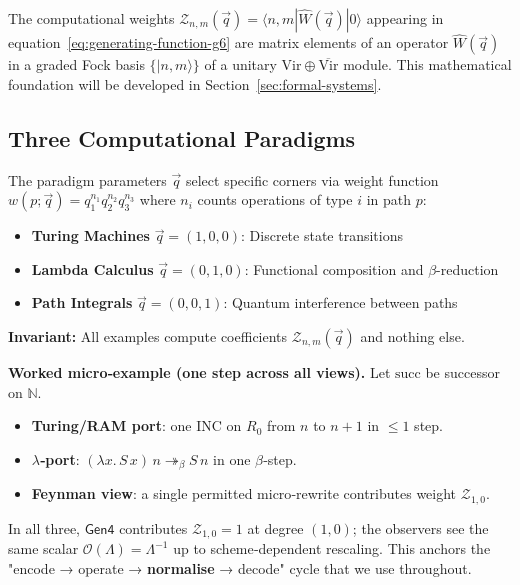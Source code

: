 The computational weights $\mathcal{Z}_{n,m}(\vec{q})=\langle n,m|\hat{W}(\vec{q})|0\rangle$ appearing in equation~\eqref{eq:generating-function-g6} are matrix elements of an operator $\hat{W}(\vec{q})$ in a graded Fock basis $\{|n,m\rangle\}$ of a unitary $\text{Vir}\oplus\overline{\text{Vir}}$ module. This mathematical foundation will be developed in Section~\ref{sec:formal-systems}.

\subsection{Three Computational Paradigms}

The paradigm parameters $\vec{q}$ select specific corners via weight function $w(p;\vec{q}) = q_1^{n_1} q_2^{n_2} q_3^{n_3}$ where $n_i$ counts operations of type $i$ in path $p$:
\begin{itemize}
\item \textbf{Turing Machines} $\vec{q} = (1,0,0)$: Discrete state transitions
\item \textbf{Lambda Calculus} $\vec{q} = (0,1,0)$: Functional composition and $\beta$-reduction  
\item \textbf{Path Integrals} $\vec{q} = (0,0,1)$: Quantum interference between paths
\end{itemize}

\textbf{Invariant:} All examples compute coefficients $\mathcal{Z}_{n,m}(\vec q)$ and nothing else.

\textbf{Worked micro‑example (one step across all views).} Let $\text{succ}$ be successor on $\mathbb{N}$.

\begin{itemize}
\item \textbf{Turing/RAM port}: one INC on $R_0$ from $n$ to $n+1$ in $\leq 1$ step.
\item \textbf{$\lambda$‑port}: $(\lambda x.\,S\,x)\,n \twoheadrightarrow_\beta S\,n$ in one $\beta$‑step.
\item \textbf{Feynman view}: a single permitted micro‑rewrite contributes weight $\mathcal{Z}_{1,0}$.
\end{itemize}

In all three, $\mathsf{Gen4}$ contributes $\mathcal{Z}_{1,0}=1$ at degree $(1,0)$; the observers see the same scalar $\mathcal{O}(\Lambda)=\Lambda^{-1}$ up to scheme‑dependent rescaling. This anchors the "encode → operate → \textbf{normalise} → decode" cycle that we use throughout.
